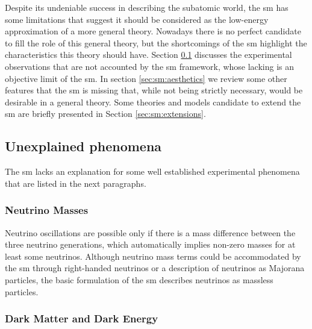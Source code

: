 Despite its undeniable success in describing the subatomic world, the \gls{sm} has some limitations that suggest it should be considered as the low-energy approximation of a more general theory. Nowadays there is no perfect candidate to fill the role of this general theory, but the shortcomings of the \gls{sm} highlight the characteristics this theory should have. Section \ref{sec:sm:missingpieces} discusses the experimental observations that are not accounted by the \gls{sm} framework, whose lacking is an objective limit of the \gls{sm}. In section \ref{sec:sm:aesthetics} we review some other features that the \gls{sm} is missing that, while not being strictly necessary, would be desirable in a general theory. Some theories and models candidate to extend the \gls{sm} are briefly presented in Section \ref{sec:sm:extensions}.

\subsection{Unexplained phenomena}
\label{sec:sm:missingpieces}

The \gls{sm} lacks an explanation for some well established experimental phenomena that are listed in the next paragraphs.

\subsubsection*{Neutrino Masses}

Neutrino oscillations \cite{PhysRevLett.81.1562} are possible only if there is a mass difference between the three neutrino generations, which automatically implies non-zero masses for at least some neutrinos. Although neutrino mass terms could be accommodated by the \gls{sm} through right-handed neutrinos or a description of neutrinos as Majorana particles, the basic formulation of the \gls{sm} describes neutrinos as massless particles.

\subsubsection*{Dark Matter and Dark Energy}


